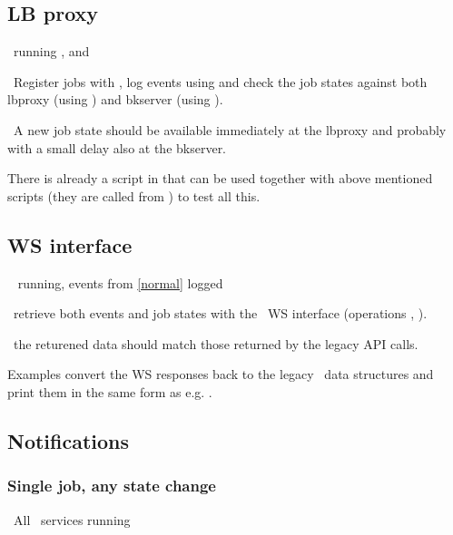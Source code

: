 \subsection{LB proxy}
\req\ running ,  and

\how\ Register jobs with , log events
using  and check the job states against
both lbproxy (using ) and bkserver
(using ).

\result\ A new job state should be available immediately at the
lbproxy and probably with a small delay also at the bkserver.

\begin{hints}
There is already a script  in
 that can be used together with
above mentioned scripts  (they are called from
) to test all this.
\end{hints}

\subsection{WS interface}
\req\  running, events from \ref{normal} logged

\how\ retrieve both events and job states with the \LB\ WS interface
(operations , ).

\result\ the returened data should match those returned by the legacy
API calls.

\begin{hints}
Examples  convert the WS
responses back to the legacy \LB\ data structures and print them in
the same form as e.g. .
\end{hints}

\subsection{Notifications}

\subsubsection{Single job, any state change}
\label{notif1}
\req\ All \LB\ services running

